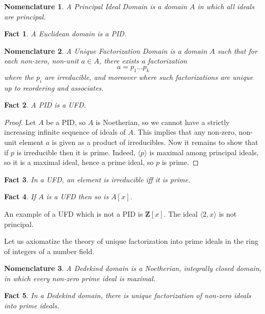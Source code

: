 \documentclass[12pt]{article}
\newtheorem*{fact*}{Fact}
\newtheorem*{nomn*}{Nomenclature}
\newcommand{\gen}[1]{\langle#1\rangle}
\newcommand{\Z}{\mathbf{Z}}
\begin{document}
\begin{nomn*}
A \emph{Principal Ideal Domain} is a domain $A$ in which all ideals are principal.
\end{nomn*}

\begin{fact*}
A Euclidean domain is a PID.
\end{fact*}

\begin{nomn*}
A \emph{Unique Factorization Domain} is a domain $A$ such that for each non-zero, non-unit $a\in A$, there exists a factorization
\[ a = p_1\dots p_k\]
where the $p_i$ are irreducible, and moreover where such factorizations are unique up to reordering and associates. 
\end{nomn*}

\begin{fact*}
A PID is a UFD.
\end{fact*}

\begin{proof}
Let $A$ be a PID, so $A$ is Noetherian, so we cannot have a strictly increasing infinite sequence of ideals of $A$. This implies that any non-zero, non-unit element $a$ is given as a product of irreducibles. Now it remains to show that if $p$ is irreducible then it is prime. Indeed, $\gen{p}$ is maximal among principal ideals, so it is a maximal ideal, hence a prime ideal, so $p$ is prime.
\end{proof}

\begin{fact*}
In a UFD, an element is irreducible iff it is prime.
\end{fact*}

\begin{fact*}
If $A$ is a UFD then so is $A[x]$.
\end{fact*}


An example of a UFD which is not a PID is $\Z[x]$. The ideal $\gen{2,x}$ is not principal.


Let us axiomatize the theory of unique factorization into prime ideals in the ring of integers of a number field.

\begin{nomn*}
A \emph{Dedekind domain} is a Noetherian, integrally closed domain, in which every non-zero prime ideal is maximal.
\end{nomn*}

\begin{fact*}
In a Dedekind domain, there is unique factorization of non-zero ideals into prime ideals.
\end{fact*}
\end{document}
